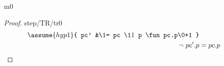 \documentclass[12pt]{amsart}
\begin{document}
\begin{machine}{m0}

\begin{proof}{step/TR/tr0}
\begin{align}
	\assume{hyp1}{ pc' &\1= pc \1| p \fun pc.p\0+1 } \\
	\goal{\neg ~ pc'.p  &= pc.p}
\end{align}
	\easy
\end{proof}


\end{machine}
\end{document}
